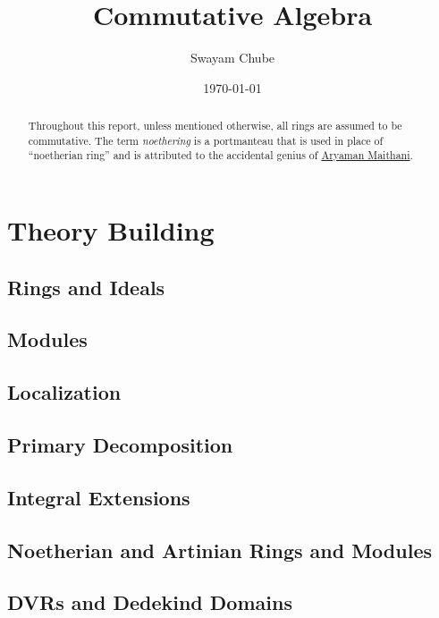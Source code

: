 \documentclass{report}
\title{Commutative Algebra}
\author{Swayam Chube}
\date{\today}
\begin{document}
\maketitle

\begin{abstract}
    Throughout this report, unless mentioned otherwise, all rings are assumed to be commutative. The term \textit{noethering} is a portmanteau that is used in place of ``noetherian ring'' and is attributed to the accidental genius of \href{https://youtu.be/RrjJfyEF7Ak?t=1259}{Aryaman Maithani}.
\end{abstract}

\tableofcontents


\part{Theory Building}
\chapter{Rings and Ideals}


\chapter{Modules}


\chapter{Localization}


\chapter{Primary Decomposition}


\chapter{Integral Extensions}


\chapter{Noetherian and Artinian Rings and Modules}


\chapter{DVRs and Dedekind Domains}

% 

% 
% 
\end{document}
